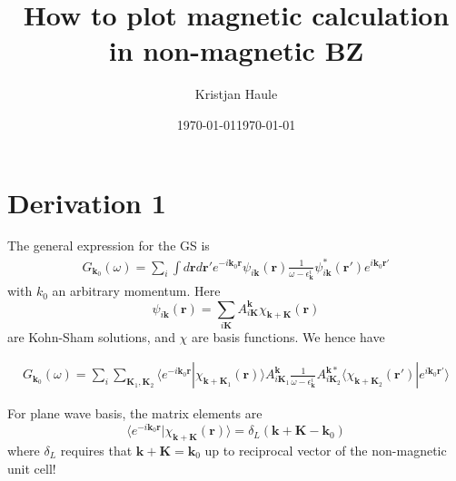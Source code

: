 \documentclass[aps,prb,floatfix,epsfig,twocolumn,showpacs,preprintnumbers]{revtex4}
\renewcommand{\vr}{{\mathbf{r}}}
\newcommand{\vk}{{\mathbf{k}}}
\newcommand{\vK}{{\mathbf{K}}}
\begin{document}
\title{How to plot magnetic calculation in non-magnetic BZ}
\author{Kristjan Haule}
\date{\today}

\date{\today}
\maketitle

\section{Derivation 1}

The general expression for the GS is
\begin{eqnarray}
G_{\vk_0}(\omega) = \sum_i\int d\vr d\vr' e^{-i\vk_0 \vr}\psi_{i\vk}(\vr)\frac{1}{\omega-\epsilon_\vk^i}\psi_{i\vk}^*(\vr')e^{i\vk_0\vr'}
\end{eqnarray}
with $k_0$ an arbitrary momentum. Here 
\begin{equation}
\psi_{i\vk}(\vr)=\sum_{i\vK} A_{i\vK}^{\vk}\chi_{\vk+\vK}(\vr)
\end{equation}
are Kohn-Sham solutions, and $\chi$ are basis functions.
We hence have
\begin{widetext}
\begin{eqnarray}
G_{\vk_0}(\omega) = \sum_i\sum_{\vK_1,\vK_2} \langle e^{-i\vk_0
  \vr}|\chi_{\vk+\vK_1}(\vr)\rangle
A_{i\vK_1}^\vk\frac{1}{\omega-\epsilon_\vk^i}A_{i\vK_2}^{\vk *}\langle
\chi_{\vk+\vK_2}(\vr')|e^{i\vk_0\vr'}\rangle
\end{eqnarray}
\end{widetext}

For plane wave basis, the matrix elements are
$$\langle e^{-i\vk_0 \vr}|\chi_{\vk+\vK}(\vr)\rangle = \delta_L(\vk+\vK-\vk_0) $$
where $\delta_L$ requires that $\vk+\vK=\vk_0$ up to reciprocal vector
of the non-magnetic unit cell!
\end{document}
